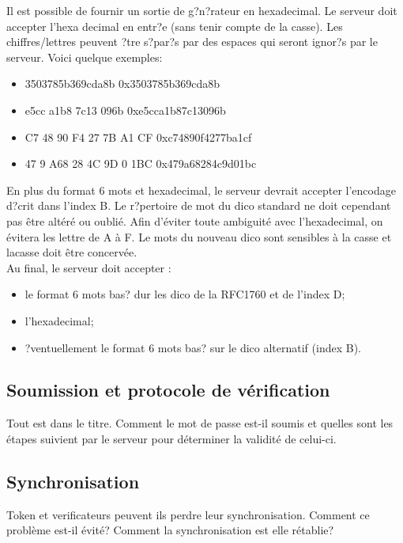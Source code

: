 \documentclass{../res/univ-projet}
\begin{document}
        Il est possible de fournir un sortie de g?n?rateur en hexadecimal. Le serveur doit accepter l'hexa decimal en entr?e (sans tenir compte de la casse). Les chiffres/lettres peuvent ?tre s?par?s par des espaces qui seront ignor?s par le serveur. Voici quelque exemples:
        \begin{itemize}
            \item 3503785b369cda8b              0x3503785b369cda8b
            \item e5cc a1b8 7c13 096b           0xe5cca1b87c13096b
            \item C7 48 90 F4 27 7B A1 CF       0xc74890f4277ba1cf
            \item 47 9 A68 28 4C 9D 0 1BC       0x479a68284c9d01bc
        \end{itemize}

        En plus du format 6 mots et hexadecimal, le serveur devrait accepter l'encodage d?crit dans l'index B. Le r?pertoire de mot du dico standard ne doit cependant pas \^etre altéré ou oubli\'e. Afin d'\'eviter toute ambiguit\'e avec l'hexadecimal, on \'evitera les lettre de A à F. Le mots du nouveau dico sont sensibles à la casse et lacasse doit être concervée.\\

        Au final, le serveur doit accepter :
        \begin{itemize}
            \item le format 6 mots bas? dur les dico de la RFC1760 et de l'index D;
            \item l'hexadecimal;
            \item ?ventuellement le format 6 mots bas? sur le dico alternatif (index B).
        \end{itemize}
  
  \subsection{Soumission et protocole de vérification}
    Tout est dans le titre. Comment le mot de passe est-il soumis et quelles sont les étapes suivient par le serveur pour déterminer la validité de celui-ci.
  
  \subsection{Synchronisation}
    Token et verificateurs peuvent ils perdre leur synchronisation. Comment ce problème est-il évité? Comment la synchronisation est elle rétablie?
  
\end{document}
